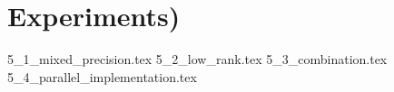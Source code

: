 \chapter{Experiments)}
\label{chap:experiments}

{5_1_mixed_precision.tex}
{5_2_low_rank.tex}
{5_3_combination.tex}
{5_4_parallel_implementation.tex}